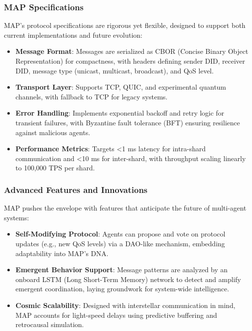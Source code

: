 \documentclass[a4paper,11pt]{article}
\begin{document}
\subsubsection{MAP Specifications}
MAP’s protocol specifications are rigorous yet flexible, designed to support both current implementations and future evolution:
\begin{itemize}[leftmargin=*]
    \item \textbf{Message Format}: Messages are serialized as CBOR (Concise Binary Object Representation) for compactness, with headers defining sender DID, receiver DID, message type (unicast, multicast, broadcast), and QoS level.
    \item \textbf{Transport Layer}: Supports TCP, QUIC, and experimental quantum channels, with fallback to TCP for legacy systems.
    \item \textbf{Error Handling}: Implements exponential backoff and retry logic for transient failures, with Byzantine fault tolerance (BFT) ensuring resilience against malicious agents.
    \item \textbf{Performance Metrics}: Targets <1 ms latency for intra-shard communication and <10 ms for inter-shard, with throughput scaling linearly to 100,000 TPS per shard.
\end{itemize}

\subsubsection{Advanced Features and Innovations}
MAP pushes the envelope with features that anticipate the future of multi-agent systems:
\begin{itemize}[leftmargin=*]
    \item \textbf{Self-Modifying Protocol}: Agents can propose and vote on protocol updates (e.g., new QoS levels) via a DAO-like mechanism, embedding adaptability into MAP’s DNA.
    \item \textbf{Emergent Behavior Support}: Message patterns are analyzed by an onboard LSTM (Long Short-Term Memory) network to detect and amplify emergent coordination, laying groundwork for system-wide intelligence.
    \item \textbf{Cosmic Scalability}: Designed with interstellar communication in mind, MAP accounts for light-speed delays using predictive buffering and retrocausal simulation.
\end{itemize}
\end{document}
